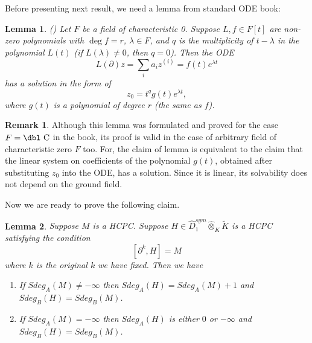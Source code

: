 \documentclass[11pt]{article}
\theoremstyle{definition}
\newcommand{\dc}{{\mbox{\dbl C}}}
\newtheorem{rem}{Remark}[section]
\theoremstyle{plain}
\newtheorem{lemma}{Lemma}[section]
\numberwithin{equation}{section}
\begin{document}
Before presenting next result, we need a lemma from standard ODE book:  

\begin{lemma}{(\cite[Ch.2, item 10 Th.8]{Pont})}
	\label{L:Port}
	Let $F$ be a field of characteristic 0. Suppose $L,f\in F[t]$ are non-zero polynomials with $\deg f=r$, $\lambda\in F$, and $q$ is the multiplicity of $t-\lambda$ in the polynomial $L(t)$ (if $L(\lambda )\neq 0$, then $q=0$). Then the ODE
	$$
	L(\partial )z=\sum_{i}a_{i}z^{(i)}=f(t)e^{\lambda t}
	$$
	has a solution in the form of 
	$$
	z_0=t^q g(t)e^{\lambda t},
	$$
	where $g(t)$ is  a polynomial of  degree $r$ (the same as $f$).
\end{lemma}

\begin{rem} Although this lemma was formulated and proved for the case $F=\dc$ in the book, its proof is valid in the case of arbitrary field of characteristic zero $F$ too. For, the claim of lemma is equivalent to the claim that the linear system on coefficients of the polynomial $g(t)$, obtained after substituting $z_0$ into the ODE, has a solution. Since it is linear, its solvability  does not depend on the ground field.
\end{rem}

Now we are ready to prove the following claim. 

\begin{lemma}
	\label{L:ODE sol}
	Suppose $M$ is a HCPC. Suppose $H\in \hat{D}_1^{sym}\hat{\otimes}_K\tilde{K}$ is a HCPC  satisfying the condition
	$$
	[\partial^k,H]=M
	$$
	where $k$ is the original $k$ we have fixed. Then we have 
	\begin{enumerate}
	    \item If $Sdeg_A(M)\neq -\infty$ then $Sdeg_A(H)=Sdeg_A(M)+1$ and $Sdeg_B(H)=Sdeg_B(M)$.
	    \item If $Sdeg_A(M)= -\infty$ then  $Sdeg_A(H)$ is either $0$ or $-\infty$ and $Sdeg_B(H)=Sdeg_B(M)$.
	\end{enumerate}
\end{lemma}
\end{document}
